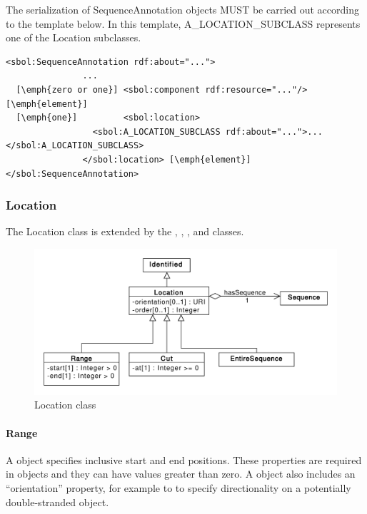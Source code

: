 The serialization of SequenceAnnotation objects MUST be carried out according to the template below. In this template, A\_LOCATION\_SUBCLASS represents one of the Location subclasses.
\begin{lstlisting}
<sbol:SequenceAnnotation rdf:about="...">
               ...   
  [\emph{zero or one}] <sbol:component rdf:resource="..."/> [\emph{element}] 
  [\emph{one}]         <sbol:location>
                 <sbol:A_LOCATION_SUBCLASS rdf:about="...">...</sbol:A_LOCATION_SUBCLASS>
               </sbol:location> [\emph{element}] 
</sbol:SequenceAnnotation>
\end{lstlisting}




\subsubsection{Location}
\label{sec:Location}
The Location class is extended by the , , , and  classes.


\begin{figure}[ht]
\begin{center}
\includegraphics[scale=0.6]{uml/location}
\caption[]{Location class}
\label{uml:location}
\end{center}
\end{figure}




\paragraph{Range}
\label{sec:Range}
A  object specifies inclusive start and end positions. These properties are required in  objects and they can have  values greater than zero. A  object also includes an  ``orientation'' property, for example to to specify directionality on a potentially double-stranded  object.

